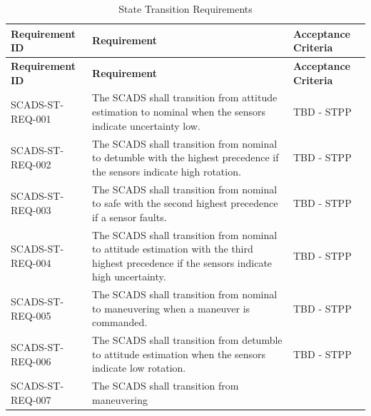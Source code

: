 \documentclass{article}
\begin{document}
            \renewcommand{\arraystretch}{1.4}
            \begin{longtable}{|l|p{9cm}|p{5cm}|}
                \caption{State Transition Requirements} \\
                \hline
                \textbf{Requirement ID} & \textbf{Requirement} & 
                    \textbf{Acceptance Criteria} \\ \hline
                \endfirsthead

                \hline
                \textbf{Requirement ID} & \textbf{Requirement} & 
                    \textbf{Acceptance Criteria} \\ \hline
                \endhead
                \hline
                \endfoot
                SCADS-ST-REQ-001 & The SCADS shall transition from attitude 
                                    estimation to nominal when the sensors
                                    indicate uncertainty low. 
                                    & TBD - STPP \\ \hline
                SCADS-ST-REQ-002 & The SCADS shall transition from nominal 
                                    to detumble with the highest precedence if the
                                    sensors indicate high rotation.& TBD - STPP \\ \hline
                SCADS-ST-REQ-003 & The SCADS shall transition from nominal 
                                    to safe with the second highest precedence if 
                                    a sensor faults. & TBD - STPP \\ \hline
                SCADS-ST-REQ-004 & The SCADS shall transition from nominal 
                                    to attitude estimation with the third highest 
                                    precedence if the sensors indicate high 
                                    uncertainty. & TBD - STPP \\ \hline
                SCADS-ST-REQ-005 & The SCADS shall transition from nominal 
                                    to maneuvering when a maneuver is commanded. 
                                    & TBD - STPP \\ \hline
                SCADS-ST-REQ-006 & The SCADS shall transition from detumble 
                                    to attitude estimation when the sensors
                                    indicate low rotation. 
                                    & TBD - STPP \\ \hline
                SCADS-ST-REQ-007 & The SCADS shall transition from maneuvering

\end{longtable}
\end{document}

